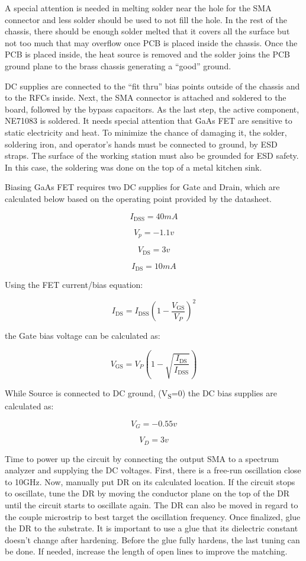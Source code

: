 A special attention is needed in melting solder near the hole for the
SMA connector and less solder should be used to not fill the hole. In
the rest of the chassis, there should be enough solder melted that it
covers all the surface but not too much that may overflow once PCB is
placed inside the chassis. Once the PCB is placed inside, the heat
source is removed and the solder joins the PCB ground plane to the brass
chassis generating a ``good'' ground.

DC supplies are connected to the ``fit thru'' bias points outside of the
chassis and to the RFCs inside. Next, the SMA connector is attached and
soldered to the board, followed by the bypass capacitors. As the last
step, the active component, NE71083 is soldered. It needs special
attention that GaAs FET are sensitive to static electricity and heat. To
minimize the chance of damaging it, the solder, soldering iron, and
operator's hands must be connected to ground, by ESD straps. The surface
of the working station must also be grounded for ESD safety. In this
case, the soldering was done on the top of a metal kitchen sink.

Biasing GaAs FET requires two DC supplies for Gate and Drain, which are
calculated below based on the operating point provided by the datasheet.

\[I_{\text{DSS}} = 40mA\]

\[V_{p} = - 1.1v\]

\[V_{\text{DS}} = 3v\]

\[I_{\text{DS}} = 10mA\]

Using the FET current/bias equation:

\[I_{\text{DS}} = I_{\text{DSS}}\left( 1 - \frac{V_{\text{GS}}}{V_{P}} \right)^{2}\]

the Gate bias voltage can be calculated as:

\[V_{\text{GS}} = V_{P}\left( 1 - \sqrt{\frac{I_{\text{DS}}}{I_{\text{DSS}}}} \right)\]

While Source is connected to DC ground, (V\textsubscript{S}=0) the DC
bias supplies are calculated as:

\[V_{G} = - 0.55v\]

\[V_{D} = 3v\]

Time to power up the circuit by connecting the output SMA to a spectrum
analyzer and supplying the DC voltages. First, there is a free-run
oscillation close to 10GHz. Now, manually put DR on its calculated
location. If the circuit stops to oscillate, tune the DR by moving the
conductor plane on the top of the DR until the circuit starts to
oscillate again. The DR can also be moved in regard to the couple
microstrip to best target the oscillation frequency. Once finalized,
glue the DR to the substrate. It is important to use a glue that its
dielectric constant doesn't change after hardening. Before the glue
fully hardens, the last tuning can be done. If needed, increase the
length of open lines to improve the matching.

